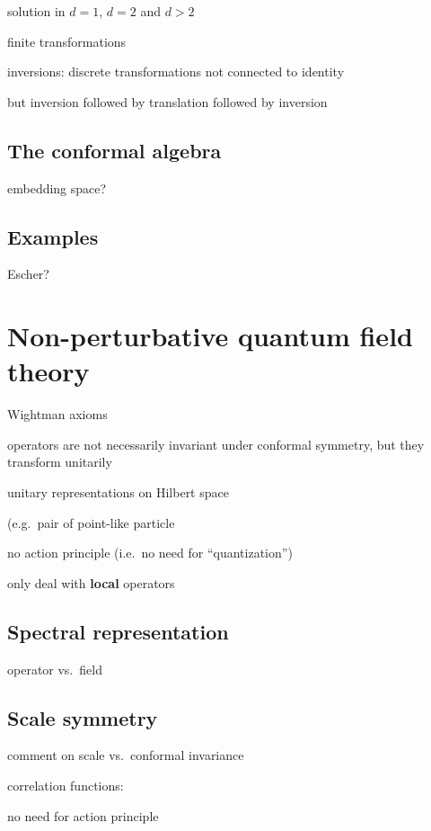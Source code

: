 \documentclass[a4paper,12pt]{article}
\numberwithin{equation}{section}
\begin{document}
solution in $d = 1$, $d = 2$ and $d > 2$



finite transformations


inversions: discrete transformations not connected to identity

but inversion followed by translation followed by inversion

\subsection{The conformal algebra}


embedding space?

\subsection{Examples}

Escher?





\section{Non-perturbative quantum field theory}

Wightman axioms

operators are not necessarily invariant under conformal symmetry, but they transform unitarily

unitary representations on Hilbert space

(e.g.~pair of point-like particle

no action principle
(i.e.~no need for ``quantization'')


only deal with \textbf{local} operators


\subsection{Spectral representation}

operator vs.~field

\subsection{Scale symmetry}


comment on scale vs.~conformal invariance

correlation functions:

no need for action principle
\end{document}
